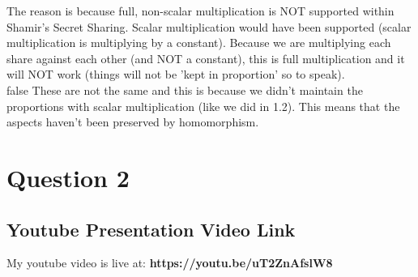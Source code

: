 \documentclass[10pt]{article}
\begin{document}
\vspace{0.1in}
\noindent The reason is because full, non-scalar multiplication is NOT supported within Shamir's Secret Sharing. Scalar multiplication would have been supported (scalar multiplication is multiplying by a constant). Because we are multiplying each share against each other (and NOT a constant), this is full multiplication and it will NOT work (things will not be 'kept in proportion' so to speak).\\

\if false
\noindent These are not the same and this is because we didn't maintain the proportions with scalar multiplication (like we did in 1.2). This means that the aspects haven't been preserved by homomorphism. 
\fi






\vspace{0.2in}
\section{Question 2}
\subsection{Youtube Presentation Video Link}
\noindent My youtube video is live at: \textbf{https://youtu.be/uT2ZnAfslW8}
\end{document}
